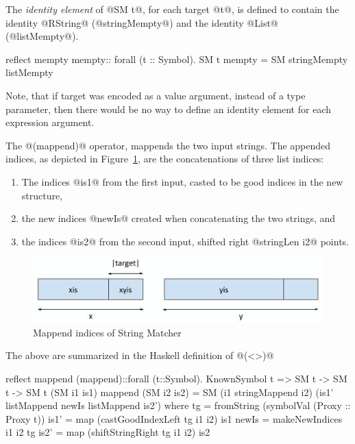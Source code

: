 The \textit{identity element} of @SM t@, for each target @t@, is
defined to contain the identity @RString@ (@stringMempty@) and the
identity @List@ (@listMempty@).
\begin{code}
reflect mempty
mempty:: forall (t :: Symbol). SM t
mempty = SM stringMempty listMempty
\end{code}
%
Note, that if target was encoded as a value argument, instead of a
type parameter, then there would be no way to define an identity
element for each expression argument.
%


The @(mappend)@ operator,
mappends the two input strings.
The appended indices, as depicted in Figure~\ref{fig:mappend:indices},
are the concatenations of three list indices:
\begin{enumerate}
\item The indices @is1@ from the first input, casted to be good indices in the new structure,
\item the new indices @newIs@ created when concatenating the two strings, and
\item the indices @is2@ from the second input, shifted right @stringLen i2@ points.
\end{enumerate}
%
\begin{figure}
\includegraphics[scale=0.5]{makeIndices}
\caption{Mappend indices of String Matcher}
\label{fig:mappend:indices}
\end{figure}
%
The above are summarized in the Haskell definition of @(<>)@
\begin{code}
reflect mappend
(mappend)::forall (t::Symbol). KnownSymbol t => SM t -> SM t -> SM t
(SM i1 is1) mappend (SM i2 is2)
  = SM (i1 stringMappend i2) (is1' listMappend newIs listMappend is2')
  where
    tg    = fromString (symbolVal (Proxy :: Proxy t))
    is1'  = map (castGoodIndexLeft tg i1 i2) is1
    newIs = makeNewIndices i1 i2 tg
    is2'  = map (shiftStringRight tg i1 i2) is2
\end{code}

